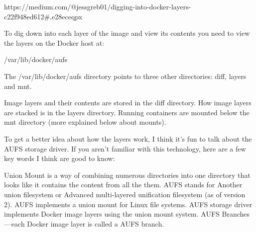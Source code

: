 https://medium.com/@jessgreb01/digging-into-docker-layers-c22f948ed612#.e28eceqpx

To dig down into each layer of the image and view its contents you need to view the layers on the Docker host at:

   /var/lib/docker/aufs


The /var/lib/docker/aufs directory points to three other directories: diff, layers and mnt.

    Image layers and their contents are stored in the diff directory.
    How image layers are stacked is in the layers directory.
    Running containers are mounted below the mnt directory (more explained below about mounts).
    
    
To get a better idea about how the layers work, I think it’s fun to talk about the AUFS storage driver. If you aren’t familiar with this technology, here are a few key words I think are good to know:

    Union Mount is a way of combining numerous directories into one directory that looks like it contains the content from all the them.
    AUFS stands for Another union filesystem or Advanced multi-layered unification filesystem (as of version 2). AUFS implements a union mount for Linux file systems.
    AUFS storage driver implements Docker image layers using the union mount system.
    AUFS Branches — each Docker image layer is called a AUFS branch.